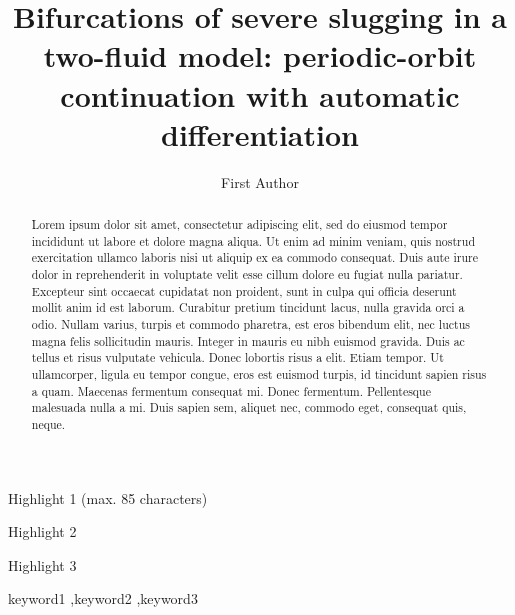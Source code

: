 \documentclass[a4paper,fleqn]{cas-sc}
\begin{document}
\let\WriteBookmarks\relax
\def\floatpagepagefraction{1}
\def\textpagefraction{.001}


\title[mode = title]{Bifurcations of severe slugging in a two-fluid model: periodic-orbit continuation with automatic differentiation}

\author[1]{First Author}
\cormark[1]



\begin{abstract}
Lorem ipsum dolor sit amet, consectetur adipiscing elit, sed do eiusmod tempor incididunt ut labore et dolore magna aliqua. Ut enim ad minim veniam, quis nostrud exercitation ullamco laboris nisi ut aliquip ex ea commodo consequat. Duis aute irure dolor in reprehenderit in voluptate velit esse cillum dolore eu fugiat nulla pariatur. Excepteur sint occaecat cupidatat non proident, sunt in culpa qui officia deserunt mollit anim id est laborum. Curabitur pretium tincidunt lacus, nulla gravida orci a odio. Nullam varius, turpis et commodo pharetra, est eros bibendum elit, nec luctus magna felis sollicitudin mauris. Integer in mauris eu nibh euismod gravida. Duis ac tellus et risus vulputate vehicula. Donec lobortis risus a elit. Etiam tempor. Ut ullamcorper, ligula eu tempor congue, eros est euismod turpis, id tincidunt sapien risus a quam. Maecenas fermentum consequat mi. Donec fermentum. Pellentesque malesuada nulla a mi. Duis sapien sem, aliquet nec, commodo eget, consequat quis, neque.
\end{abstract}

\begin{highlights}
\item Highlight 1 (max. 85 characters)
\item Highlight 2
\item Highlight 3
\end{highlights}

\begin{keywords}
keyword1 \sep keyword2 \sep keyword3
\end{keywords}
\end{document}
